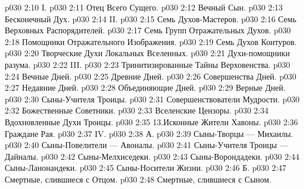 \vs p030 2:10 \pc I. 
\vs p030 2:11 \pc {}\bibnobreakspace Отец Всего Сущего.
\vs p030 2:12 \bibnobreakspace Вечный Сын.
\vs p030 2:13 \bibnobreakspace Бесконечный Дух.
\vs p030 2:14 \pc II. 
\vs p030 2:15 \bibnobreakspace Семь Духов\hyp{}Мастеров.
\vs p030 2:16 \bibnobreakspace Семь Верховных Распорядителей.
\vs p030 2:17 \bibnobreakspace Семь Групп Отражательных Духов.
\vs p030 2:18 \bibnobreakspace Помощники Отражательного Изображения.
\vs p030 2:19 \bibnobreakspace Семь Духов Контуров.
\vs p030 2:20 \bibnobreakspace Творческие Духи Локальных Вселенных.
\vs p030 2:21 \bibnobreakspace Духи\hyp{}помощники разума.
\vs p030 2:22 \pc III. 
\vs p030 2:23 \bibnobreakspace Тринитизированные Тайны Верховенства.
\vs p030 2:24 \bibnobreakspace Вечные Дней.
\vs p030 2:25 \bibnobreakspace Древние Дней.
\vs p030 2:26 \bibnobreakspace Совершенства Дней.
\vs p030 2:27 \bibnobreakspace Недавние Дней.
\vs p030 2:28 \bibnobreakspace Объединяющие Дней.
\vs p030 2:29 \bibnobreakspace Верные Дней.
\vs p030 2:30 \bibnobreakspace Сыны\hyp{}Учителя Троицы.
\vs p030 2:31 \bibnobreakspace Совершенствователи Мудрости.
\vs p030 2:32 \bibnobreakspace Божественные Советники.
\vs p030 2:33 \bibnobreakspace Вселенские Цензоры.
\vs p030 2:34 \bibnobreakspace Вдохновленные Духи Троицы.
\vs p030 2:35 13.Исконные Жители Хавоны.
\vs p030 2:36 \bibnobreakspace Граждане Рая.
\vs p030 2:37 \pc IV. 
\vs p030 2:38 \pc А. 
\vs p030 2:39 \bibnobreakspace Сыны\hyp{}Творцы --- Михаилы.
\vs p030 2:40 \bibnobreakspace Сыны\hyp{}Повелители --- Авоналы.
\vs p030 2:41 \bibnobreakspace Сыны\hyp{}Учителя Троицы --- Дайналы.
\vs p030 2:42 \bibnobreakspace Сыны\hyp{}Мелхиседеки.
\vs p030 2:43 \bibnobreakspace Сыны\hyp{}Ворондадеки.
\vs p030 2:44 \bibnobreakspace Сыны\hyp{}Ланонандеки.
\vs p030 2:45 \bibnobreakspace Сыны\hyp{}Носители Жизни.
\vs p030 2:46 \pc Б. 
\vs p030 2:47 \bibnobreakspace Смертные, слившиеся с Отцом.
\vs p030 2:48 \bibnobreakspace Смертные, слившиеся с Сыном.
